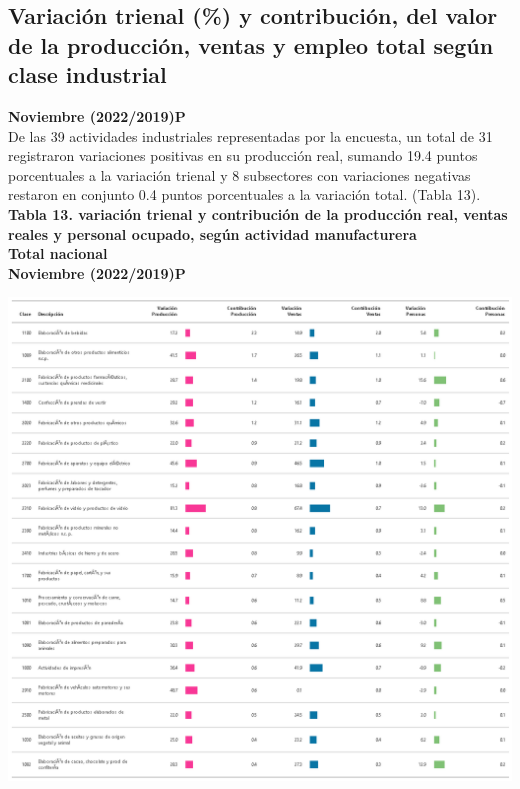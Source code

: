 \documentclass[
]{article}
\begin{document}
\hypertarget{variaciuxf3n-trienal-y-contribuciuxf3n-del-valor-de-la-producciuxf3n-ventas-y-empleo-total-seguxfan-clase-industrial}{%
\subsection{Variación trienal (\%) y contribución, del valor de la
producción, ventas y empleo total según clase
industrial}\label{variaciuxf3n-trienal-y-contribuciuxf3n-del-valor-de-la-producciuxf3n-ventas-y-empleo-total-seguxfan-clase-industrial}}

\textbf{Noviembre (2022/2019)P}\\

De las 39 actividades industriales representadas por la encuesta, un
total de 31 registraron variaciones positivas en su producción real,
sumando 19.4 puntos porcentuales a la variación trienal y 8 subsectores
con variaciones negativas restaron en conjunto 0.4 puntos porcentuales a
la variación total. (Tabla 13).\\
\newpage \textbf{Tabla 13. variación trienal y contribución de la
producción real, ventas reales y personal ocupado, según actividad
manufacturera}\\
\textbf{Total nacional}\\
\textbf{Noviembre (2022/2019)P}\\

\begin{center}\includegraphics[width=14.78in]{tabla13_1} \end{center}
\end{document}
